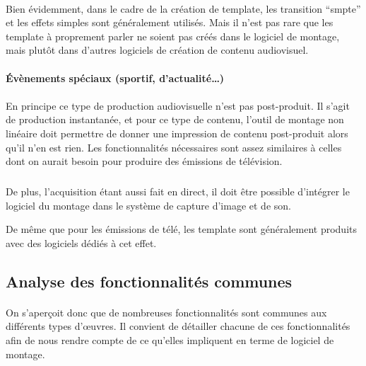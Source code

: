 \paragraph{}

Bien évidemment, dans le cadre de la création de template,
les transition ``smpte'' et les effets simples sont
généralement utilisés. Mais il n'est pas rare que les template à
proprement parler ne soient pas créés dans le logiciel de montage,
mais plutôt dans d'autres logiciels de création de contenu audiovisuel.

\paragraph {Évènements spéciaux (sportif, d'actualité\ldots)}

\paragraph{}

En principe ce type de production audiovisuelle n'est pas post-produit. Il
s'agit de production instantanée, et pour ce type de contenu, l'outil
de montage non linéaire doit permettre de donner une impression de
contenu post-produit alors qu'il n'en est rien. Les fonctionnalités
nécessaires sont assez similaires à celles dont on aurait besoin pour
produire des émissions de télévision.

\subparagraph{}

De plus, l'acquisition étant aussi fait en direct, il doit être possible
d'intégrer le logiciel du montage dans le système de capture d'image
et de son.

De même que pour les émissions de télé, les template sont
généralement produits avec des logiciels dédiés à cet effet.

\subsection{Analyse des fonctionnalités communes}

\paragraph{}

On s'aperçoit donc que de nombreuses fonctionnalités sont communes aux
différents types d'œuvres. Il convient de détailler chacune de ces
fonctionnalités afin de nous rendre compte de ce qu'elles impliquent
en terme de logiciel de montage.

